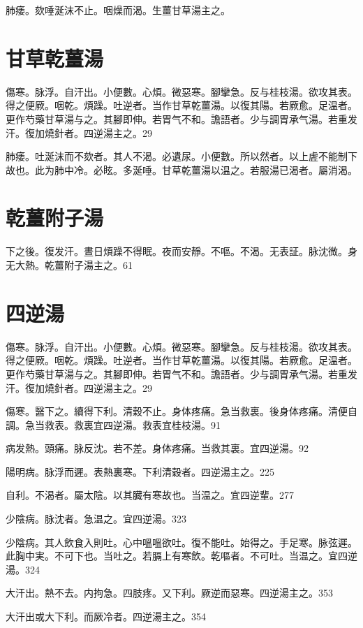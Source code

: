 \documentclass[b5paper,twoside,zihao=-4,UTF8]{ctexbook}
\begin{document}
肺痿。欬唾涎沫不止。咽燥而渴。生薑甘草湯主之。

\section{甘草乾薑湯}

傷寒。脉浮。自汗出。小便數。心煩。微惡寒。腳攣急。反与桂枝湯。欲攻其表。得之便厥。咽乾。煩躁。吐逆者。当作甘草乾薑湯。以復其陽。若厥愈。足温者。更作芍藥甘草湯与之。其腳即伸。若胃气不和。譫語者。少与{調胃}承气湯。若重发汗。復加燒針者。四逆湯主之。29

肺痿。吐涎沫而不欬者。其人不渴。必遺尿。小便數。所以然者。以上虗不能制下故也。此为肺中冷。必眩。多涎唾。甘草乾薑湯以温之。若服湯已渴者。屬消渴。

\section{乾薑附子湯}

下之後。復发汗。晝日煩躁不得眠。夜而安靜。不嘔。不渴。无表証。脉沈微。身无大熱。乾薑附子湯主之。61

\section{四逆湯}

傷寒。脉浮。自汗出。小便數。心煩。微惡寒。腳攣急。反与桂枝湯。欲攻其表。得之便厥。咽乾。煩躁。吐逆者。当作甘草乾薑湯。以復其陽。若厥愈。足温者。更作芍藥甘草湯与之。其腳即伸。若胃气不和。譫語者。少与{調胃}承气湯。若重发汗。復加燒針者。四逆湯主之。29

傷寒。醫下之。續得下利。清穀不止。身体疼痛。急当救裏。後身体疼痛。清便自調。急当救表。救裏宜四逆湯。救表宜桂枝湯。91

病发熱。頭痛。脉反沈。若不差。身体疼痛。当救其裏。宜四逆湯。92

{陽明病。}脉浮而遲。表熱裏寒。下利清穀者。四逆湯主之。225

自利。不渴者。屬太陰。以其臓有寒故也。当温之。宜四逆輩。277

少陰病。脉沈者。急温之。宜四逆湯。323

少陰病。其人飲食入則吐。心中嗢嗢欲吐。復不能吐。始得之。手足寒。脉弦遲。此胸中実。不可下也。当吐之。若膈上有寒飲。乾嘔者。不可吐。当温之。宜四逆湯。324

大汗出。熱不去。内拘急。四肢疼。{又}下利。厥逆而惡寒。四逆湯主之。353

大汗{出}或大下利。而厥冷者。四逆湯主之。354
\end{document}
